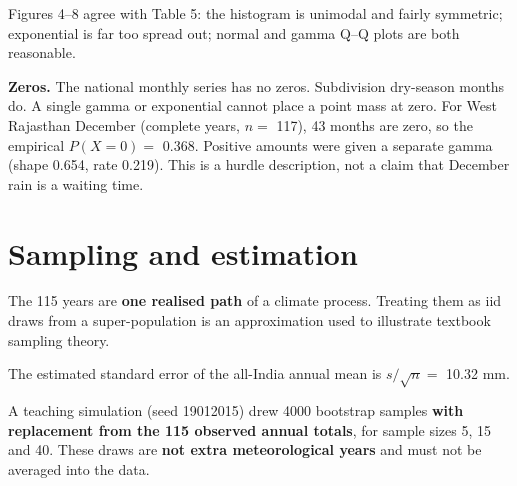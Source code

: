 \documentclass[
]{article}
\begin{document}
Figures 4--8 agree with Table 5: the histogram is unimodal and fairly
symmetric; exponential is far too spread out; normal and gamma Q--Q
plots are both reasonable.

\textbf{Zeros.} The national monthly series has no zeros. Subdivision
dry-season months do. A single gamma or exponential cannot place a point
mass at zero. For West Rajasthan December (complete years, \(n=\) 117),
43 months are zero, so the empirical \(P(X=0)=\) 0.368. Positive amounts
were given a separate gamma (shape 0.654, rate 0.219). This is a hurdle
description, not a claim that December rain is a waiting time.

\section{Sampling and estimation}\label{sampling-and-estimation}

The 115 years are \textbf{one realised path} of a climate process.
Treating them as iid draws from a super-population is an approximation
used to illustrate textbook sampling theory.

The estimated standard error of the all-India annual mean is
\(s/\sqrt{n}=\) 10.32 mm.

A teaching simulation (seed 19012015) drew 4000 bootstrap samples
\textbf{with replacement from the 115 observed annual totals}, for
sample sizes 5, 15 and 40. These draws are \textbf{not extra
meteorological years} and must not be averaged into the data.
\end{document}
